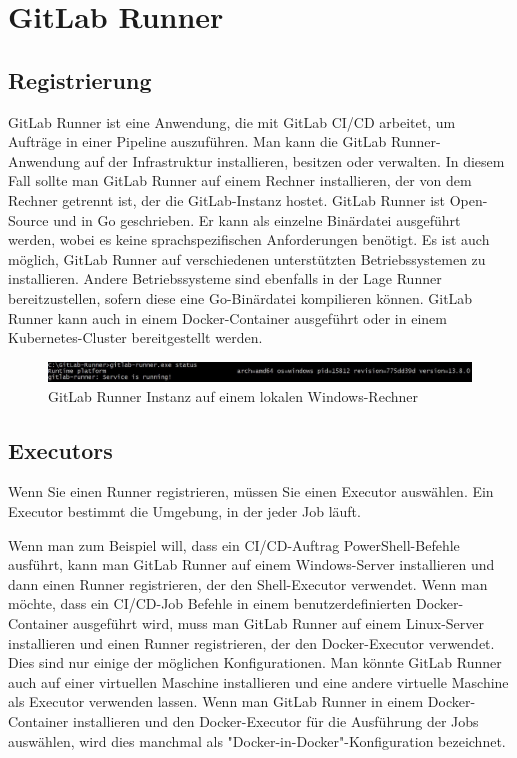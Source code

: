 \section{GitLab Runner} \label{sec:lblGitLabRunner}
\subsection{Registrierung}

GitLab Runner ist eine Anwendung, die mit GitLab CI/CD arbeitet, um Aufträge in einer Pipeline auszuführen.
Man kann die GitLab Runner-Anwendung auf der Infrastruktur installieren, besitzen oder verwalten. In diesem Fall sollte man GitLab Runner auf einem Rechner installieren, der von dem Rechner getrennt ist, der die GitLab-Instanz hostet. GitLab Runner ist Open-Source und in Go geschrieben. Er kann als einzelne Binärdatei ausgeführt werden, wobei es keine sprachspezifischen Anforderungen benötigt.
Es ist auch möglich, GitLab Runner auf verschiedenen unterstützten Betriebssystemen zu installieren. Andere Betriebssysteme sind ebenfalls in der Lage Runner bereitzustellen, sofern diese eine Go-Binärdatei kompilieren können.
GitLab Runner kann auch in einem Docker-Container ausgeführt oder in einem Kubernetes-Cluster bereitgestellt werden.\autocite{gitlabRunner}

\begin{figure}[H]
	\centerline{
		\includegraphics[width=1\textwidth, frame]{./grafiken/gitlab_runner_status.JPG}
	}
	\vskip0pt
	\caption{GitLab Runner Instanz auf einem lokalen Windows-Rechner}
\end{figure}

\subsection{Executors} \label{sssec:lblExecutor}

Wenn Sie einen Runner registrieren, müssen Sie einen Executor auswählen. Ein Executor bestimmt die Umgebung, in der jeder Job läuft.\autocite{gitlabRunner}

Wenn man zum Beispiel will, dass ein CI/CD-Auftrag PowerShell-Befehle ausführt, kann man GitLab Runner auf einem Windows-Server installieren und dann einen Runner registrieren, der den Shell-Executor verwendet.
Wenn man möchte, dass ein CI/CD-Job Befehle in einem benutzerdefinierten Docker-Container ausgeführt wird, muss man GitLab Runner auf einem Linux-Server installieren und einen Runner registrieren, der den Docker-Executor verwendet.
Dies sind nur einige der möglichen Konfigurationen. Man könnte GitLab Runner auch auf einer virtuellen Maschine installieren und eine andere virtuelle Maschine als Executor verwenden lassen.
Wenn man GitLab Runner in einem Docker-Container installieren und den Docker-Executor für die Ausführung der Jobs auswählen, wird dies manchmal als "Docker-in-Docker"-Konfiguration bezeichnet.\autocite{gitlabRunner}

